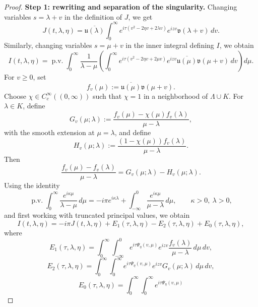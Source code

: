 \documentclass[10pt]{article}
\numberwithin{equation}{section}
\numberwithin{theorem}{section}
\begin{document}
\begin{appendix}
\begin{proof}
\medskip
\noindent\textbf{Step 1: rewriting and separation of the singularity.}
Changing variables \(s=\lambda+v\) in the definition of \(J\), we get
\begin{equation}
\label{eq:propa3-J-rewrite}
J(t,\lambda,\eta)
=
\overline{\mathfrak u(\lambda)}
\int_0^\infty
e^{i\tau(v^2-2\eta v+2\lambda v)}
e^{izv}
\mathfrak v(\lambda+v)\,dv .
\end{equation}
Similarly, changing variables \(s=\mu+v\) in the inner integral defining \(I\), we obtain
\begin{equation}
\label{eq:propa3-I-rewrite}
I(t,\lambda,\eta)
=
\operatorname{p.v.}\int_0^\infty
\frac{1}{\lambda-\mu}
\left(
\int_0^\infty
e^{i\tau(v^2-2\eta v+2\mu v)}
e^{izv}
\overline{\mathfrak u(\mu)}\mathfrak v(\mu+v)\,dv
\right)d\mu .
\end{equation}
For \(v\ge0\), set
\[
f_v(\mu):=\overline{\mathfrak u(\mu)}\mathfrak v(\mu+v).
\]
Choose \(\chi\in C_c^\infty((0,\infty))\) such that \(\chi=1\) in a neighborhood of
\(\Lambda\cup K\). For \(\lambda\in K\), define
\[
G_v(\mu;\lambda)
:=
\frac{f_v(\mu)-\chi(\mu)f_v(\lambda)}{\mu-\lambda},
\]
with the smooth extension at \(\mu=\lambda\), and define
\[
H_v(\mu;\lambda)
:=
\frac{(1-\chi(\mu))f_v(\lambda)}{\mu-\lambda}.
\]
Then
\[
\frac{f_v(\mu)-f_v(\lambda)}{\mu-\lambda}
=
G_v(\mu;\lambda)-H_v(\mu;\lambda).
\]
Using the identity
\[
\operatorname{p.v.}\int_0^\infty
\frac{e^{i\kappa\mu}}{\lambda-\mu}\,d\mu
=
-i\pi e^{i\kappa\lambda}
+
\int_{-\infty}^0
\frac{e^{i\kappa\mu}}{\mu-\lambda}\,d\mu,
\qquad \kappa>0,\ \lambda>0,
\]
and first working with truncated principal values, we obtain
\begin{equation}
\label{eq:propa3-error-decomposition}
I(t,\lambda,\eta)
=
-i\pi J(t,\lambda,\eta)
+
E_1(\tau,\lambda,\eta)
-
E_2(\tau,\lambda,\eta)
+
E_0(\tau,\lambda,\eta),
\end{equation}
where
\begin{equation}
\label{eq:propa3-E1-def}
E_1(\tau,\lambda,\eta)
=
\int_0^\infty\int_{-\infty}^0
e^{i\tau\Psi_\eta(v,\mu)}
e^{izv}
\frac{f_v(\lambda)}{\mu-\lambda}\,d\mu\,dv,
\end{equation}
\begin{equation}
\label{eq:propa3-E2-def}
E_2(\tau,\lambda,\eta)
=
\int_0^\infty\int_0^\infty
e^{i\tau\Psi_\eta(v,\mu)}
e^{izv}
G_v(\mu;\lambda)\,d\mu\,dv,
\end{equation}
\begin{equation}
\label{eq:propa3-E0-def}
E_0(\tau,\lambda,\eta)
=
\int_0^\infty\int_0^\infty
e^{i\tau\Psi_\eta(v,\mu)}

\end{equation}
\end{proof}
\end{appendix}
\end{document}
